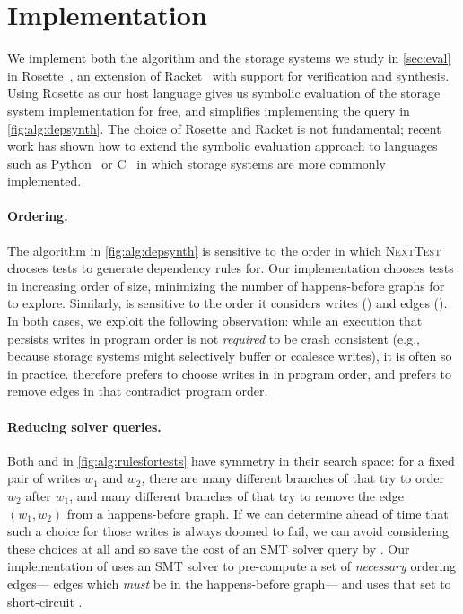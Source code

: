 \section{Implementation}\label{s:impl}

We implement both the \depsynth algorithm
and the storage systems we study in \cref{sec:eval}
in Rosette~\cite{torlak:rosette},
an extension of Racket~\cite{felleisen:racket}
with support for verification and synthesis.
Using Rosette as our host language gives us symbolic evaluation of the storage system implementation for free,
and simplifies implementing the \crashconsistentalg query in \cref{fig:alg:depsynth}.
The choice of Rosette and Racket is not fundamental;
recent work has shown how to extend the symbolic evaluation approach to languages
such as Python~\cite{sigurbjarnarson:yggdrasil} or C~\cite{nelson:serval}
in which storage systems are more commonly implemented.

\paragraph{Ordering.}
The \depsynthalg algorithm in \cref{fig:alg:depsynth}
is sensitive to the order in which \textsc{NextTest} chooses tests to generate dependency rules for.
Our implementation chooses tests in increasing order of size,
minimizing the number of happens-before graphs for  to explore.
Similarly,  is sensitive to the order it considers writes (\phaseone)
and edges (\phasetwo).
In both cases, we exploit the following observation: 
while an execution that persists writes in program order is not \emph{required} to be crash consistent
(e.g., because storage systems might selectively buffer or coalesce writes),
it is often so in practice.
 therefore prefers to choose writes in \phaseone in program order,
and prefers to remove edges in \phasetwo that contradict program order.

\paragraph{Reducing solver queries.}
Both \phaseone and \phasetwo in \cref{fig:alg:rulesfortests}
have symmetry in their search space:
for a fixed pair of writes $w_1$ and $w_2$,
there are many different branches of \phaseone
that try to order $w_2$ after $w_1$,
and many different branches of \phasetwo
that try to remove the edge $(w_1, w_2)$ from a happens-before graph.
If we can determine ahead of time that such a choice for those writes is always doomed to fail,
we can avoid considering these choices at all
and so save the cost of an SMT solver query by \crashconsistentalg.
Our implementation of 
uses an SMT solver to
pre-compute a set of \emph{necessary} ordering edges---%
edges which \emph{must} be in the happens-before graph---%
and uses that set to short-circuit \crashconsistentalg.

